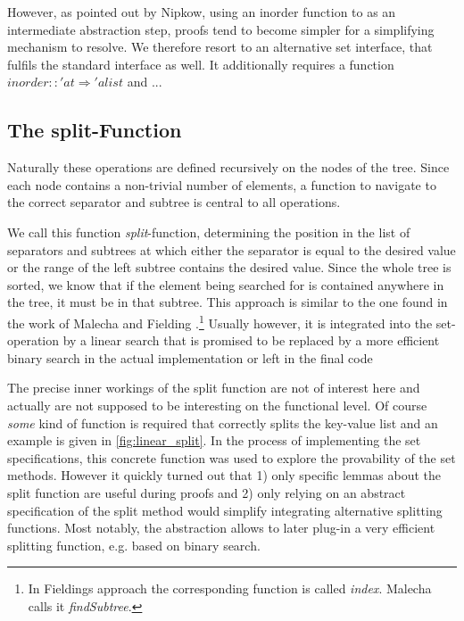 However, as pointed out by Nipkow, using an inorder function to
as an intermediate abstraction step, proofs tend to become simpler for a simplifying
mechanism to resolve. \parencite{DBLP:conf/itp/Nipkow16}
We therefore resort to an alternative set interface, that fulfils the standard interface as well.
It additionally requires a function $inorder :: 'a t \Rightarrow 'a list$
and ... %

\subsection{The split-Function}

Naturally these operations are defined recursively on the nodes of the tree.
Since each node contains a non-trivial number of elements,
a function to navigate to the correct separator and subtree is central to all operations.

We call this function \textit{split}-function,
determining the position in the list of separators and subtrees at which
either the separator is equal to the desired value or the range of the left subtree
contains the desired value.
Since the whole tree is sorted, we know that if the element being searched for
is contained anywhere in the tree, it must be in that subtree.
This approach is similar to the one found in the work of Malecha and Fielding \parencite{DBLP:conf/popl/MalechaMSW10,Fielding80}.\footnote{
    In Fieldings approach the corresponding function is called \textit{index}.
    Malecha calls it \textit{findSubtree}.
}
Usually however, it is integrated into the set-operation
by a linear search that is promised to be replaced by a more efficient binary search
in the actual implementation \parencite{DBLP:books/daglib/0023376,DBLP:journals/acta/BayerM72}
or left in the final code \parencite{DBLP:journals/sosym/ErnstSR15}

The precise inner workings of the split function are not of interest here
and actually are not supposed to be interesting on the functional level.
Of course \textit{some} kind of function is required that correctly splits
the key-value list and an example is given in \autoref{fig:linear_split}.
In the process of implementing the set specifications,
this concrete function was used to explore the provability of the set methods.
However it quickly turned out that 1) only specific lemmas about the split
function are useful during proofs and 2) only relying on an abstract specification of
the split method would simplify integrating alternative splitting functions.
Most notably, the abstraction allows to later plug-in a very efficient splitting
function, e.g. based on binary search.


